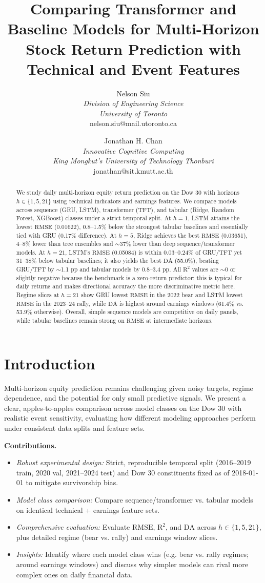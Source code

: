 \documentclass[10pt,twocolumn]{article}
\title{Comparing Transformer and Baseline Models for Multi-Horizon Stock Return Prediction with Technical and Event Features}
\author{Nelson Siu \\
\textit{Division of Engineering Science} \\
\textit{University of Toronto} \\
nelson.siu@mail.utoronto.ca
\and
Jonathan H. Chan \\
\textit{Innovative Cognitive Computing} \\
\textit{King Mongkut's University of Technology Thonburi} \\
jonathan@sit.kmutt.ac.th}
\date{}
\newcommand{\rmse}{\ensuremath{\mathrm{RMSE}}}
\newcommand{\rTwo}{\ensuremath{\mathrm{R}^2}}
\newcommand{\da}{\ensuremath{\mathrm{DA}}}
\begin{document}
\maketitle

\begin{abstract}
We study daily multi-horizon equity return prediction on the Dow 30 with horizons $h\in\{1,5,21\}$ using technical indicators and earnings features. We compare models across sequence (GRU, LSTM), transformer (TFT), and tabular (Ridge, Random Forest, XGBoost) classes under a strict temporal split. At $h=1$, LSTM attains the lowest \rmse{} (0.01622), 0.8--1.5\% below the strongest tabular baselines and essentially tied with GRU (0.17\% difference). At $h=5$, Ridge achieves the best \rmse{} (0.03651), 4--8\% lower than tree ensembles and $\sim$37\% lower than deep sequence/transformer models. At $h=21$, LSTM's \rmse{} (0.05084) is within 0.03--0.24\% of GRU/TFT yet 31--38\% below tabular baselines; it also yields the best \da{} (55.0\%), beating GRU/TFT by $\sim$1.1 pp and tabular models by 0.8--3.4 pp. All \rTwo{} values are $\sim$0 or slightly negative because the benchmark is a zero-return predictor; this is typical for daily returns and makes directional accuracy the more discriminative metric here. Regime slices at $h=21$ show GRU lowest \rmse{} in the 2022 bear and LSTM lowest \rmse{} in the 2023--24 rally, while \da{} is highest around earnings windows (61.4\% vs. 53.9\% otherwise). Overall, simple sequence models are competitive on daily panels, while tabular baselines remain strong on \rmse{} at intermediate horizons.
\end{abstract}

\section{Introduction}
Multi-horizon equity prediction remains challenging given noisy targets, regime dependence, and the potential for only small predictive signals. We present a clear, apples-to-apples comparison across model classes on the Dow 30 with realistic event sensitivity, evaluating how different modeling approaches perform under consistent data splits and feature sets.

\textbf{Contributions.}
\begin{itemize}
    \item \textit{Robust experimental design:} Strict, reproducible temporal split (2016--2019 train, 2020 val, 2021--2024 test) and Dow 30 constituents fixed as of 2018-01-01 to mitigate survivorship bias.
    \item \textit{Model class comparison:} Compare sequence/transformer vs. tabular models on identical technical + earnings feature sets.
    \item \textit{Comprehensive evaluation:} Evaluate \rmse{}, \rTwo{}, and \da{} across $h\in\{1,5,21\}$, plus detailed regime (bear vs. rally) and earnings window slices.
    \item \textit{Insights:} Identify where each model class wins (e.g. bear vs. rally regimes; around earnings windows) and discuss why simpler models can rival more complex ones on daily financial data.
\end{itemize}
\end{document}
